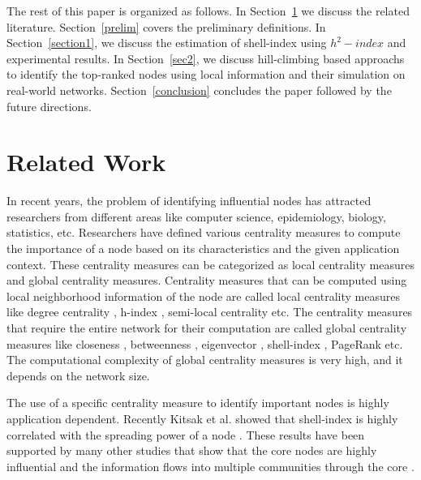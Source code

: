 \documentclass[12pt,3p]{article}
\begin{document}

The rest of this paper is organized as follows. In Section~\ref{relwork} we discuss the related literature. Section~\ref{prelim} covers the preliminary definitions. In Section~\ref{section1}, we discuss the estimation of shell-index using $h^2-index$ and experimental results. In Section~\ref{sec2}, we discuss hill-climbing based approachs to identify the top-ranked nodes using local information and their simulation on real-world networks. Section~\ref{conclusion} concludes the paper followed by the future directions.

\section{Related Work}\label{relwork}


In recent years, the problem of identifying influential nodes has attracted researchers from different areas like computer science, epidemiology, biology, statistics, etc. Researchers have defined various centrality measures to compute the importance of a node based on its characteristics and the given application context. These centrality measures can be categorized as local centrality measures and global centrality measures. Centrality measures that can be computed using local neighborhood information of the node are called local centrality measures like degree centrality \cite{shaw1954some}, h-index \cite{hirsch2005index}, semi-local centrality \cite{chen2012identifying} etc. The centrality measures that require the entire network for their computation are called global centrality measures like closeness \cite{sabidussi1966centrality}, betweenness \cite{freeman1977set}, eigenvector \cite{stephenson1989rethinking}, shell-index \cite{seidman1983network}, PageRank \cite{brin1998anatomy} etc. The computational complexity of global centrality measures is very high, and it depends on the network size.

The use of a specific centrality measure to identify important nodes is highly application dependent. Recently Kitsak et al. showed that shell-index is highly correlated with the spreading power of a node \cite{kitsak2010identification}. These results have been supported by many other studies that show that the core nodes are highly influential and the information flows into multiple communities through the core \cite{saxena2015understanding, gupta2016modeling}.
\end{document}
